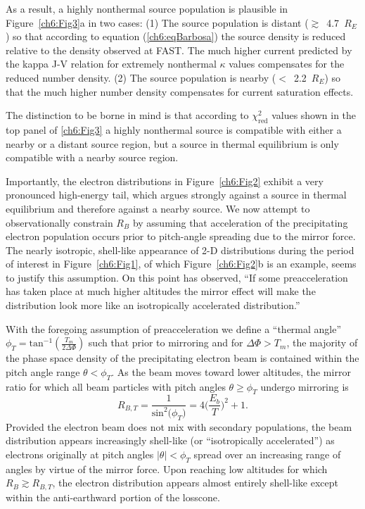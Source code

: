   As a result, a highly nonthermal source population is plausible in
  Figure~\ref{ch6:Fig3}a in two cases: (1) The source population is distant
  ($\gtrsim$~4.7~$R_E$) so that according to equation (\ref{ch6:eqBarbosa}) the
  source density is reduced relative to the density observed at FAST. The much
  higher current predicted by the kappa J-V relation for extremely nonthermal
  $\kappa$ values compensates for the reduced number density. (2) The source
  population is nearby ($<$~2.2~$R_E$) so that the much higher number density
  compensates for current saturation effects.

  The distinction to be borne in mind is that according to
  $\chi^2_{\mathrm{red}}$ values shown in the top panel of \ref{ch6:Fig3} a
  highly nonthermal source is compatible with either a nearby or a distant
  source region, but a source in thermal equilibrium is only compatible with a
  nearby source region. 

  Importantly, the electron distributions in Figure~\ref{ch6:Fig2} exhibit a
  very pronounced high-energy tail, which argues strongly against a source in
  thermal equilibrium and therefore against a nearby source. We now attempt to
  observationally constrain $R_B$ by assuming that acceleration of the
  precipitating electron population occurs prior to pitch-angle spreading due to
  the mirror force. The nearly isotropic, shell-like appearance of 2-D
  distributions during the period of interest in Figure~\ref{ch6:Fig1}, of which
  Figure~\ref{ch6:Fig2}b is an example, seems to justify this assumption. On
  this point \citet{Bostrom2003a} has observed, ``If some preacceleration has
  taken place at much higher altitudes the mirror effect will make the
  distribution look more like an isotropically accelerated distribution.''

  With the foregoing assumption of preacceleration we define a ``thermal angle''
  $\phi_T = \textrm{tan}^{-1} ( \frac{T_m}{2 \Delta \Phi} )$ such that prior to
  mirroring and for $\Delta \Phi > T_m$, the majority of the phase space density
  of the precipitating electron beam is contained within the pitch angle range $
  \theta < \phi_T$. As the beam moves toward lower altitudes, the mirror ratio
  for which all beam particles with pitch angles $\theta \geq \phi_T$ undergo
  mirroring is
  \begin{equation} \label{ch6:RBTherm} R_{B,T} = \dfrac{1}{\mathrm{sin}^2 \big
      (\phi_T \big ) } = 4 \Big ( \dfrac{E_b}{T} \Big )^2 + 1.
  \end{equation}
  Provided the electron beam does not mix with secondary populations, the beam
  distribution appears increasingly shell-like (or ``isotropically
  accelerated'') as electrons originally at pitch angles $\vert \theta \vert <
  \phi_T$ spread over an increasing range of angles by virtue of the mirror
  force. Upon reaching low altitudes for which $R_B \gtrsim R_{B,T}$, the
  electron distribution appears almost entirely shell-like except within the
  anti-earthward portion of the losscone.

